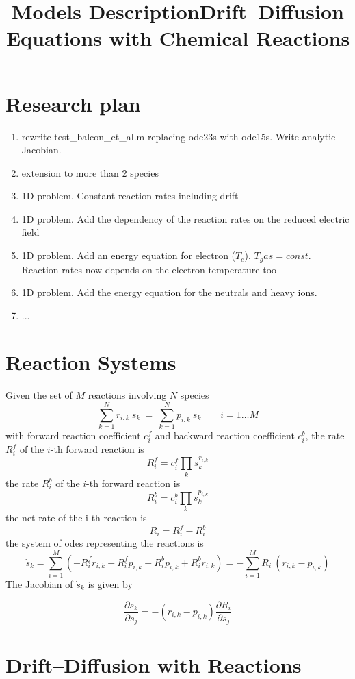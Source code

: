 \documentclass[11pt]{amsart}
\title{Models Description}
\title{Drift--Diffusion Equations with Chemical Reactions}
\begin{document}
\maketitle

\section{Research plan}
\begin{enumerate}
    \item rewrite test\_balcon\_et\_al.m replacing ode23s with ode15s. Write analytic Jacobian.
    \item extension to more than 2 species
    \item 1D problem. Constant reaction rates including drift
    \item 1D problem. Add the dependency of the reaction rates on the reduced electric field
    \item 1D problem. Add an energy equation for electron ($T_e$). $T_gas=const$. Reaction rates now depends on the electron temperature too
    \item 1D problem. Add the energy equation for the neutrals and heavy ions.
    \item ...
\end{enumerate}
\section{Reaction Systems}

Given the set of $M$ reactions involving $N$ species
\[
\sum_{k=1}^{N} r_{i,k}\ s_k\ =\ \sum_{k=1}^{N} p_{i,k}\ s_k \qquad  i=1\ldots M
\]
with forward reaction coefficient $c^f_i$ and backward reaction coefficient $c^b_i$,
the rate $R^{f}_i$ of the $i$-th forward reaction is 
$$
 R^{f}_i = c^{f}_i \prod_k s_k^{ r_{i,k} }
$$
the rate $R^{b}_i$ of the $i$-th forward reaction is 
$$
 R^{b}_i = c^{b}_i \prod_k s_k^{ p_{i,k} }
$$
the net rate of the i-th reaction is 
$$
R_i = R^{f}_i - R^{b}_i
$$
the system of odes representing the reactions is
$$
\dot{s}_k = \sum_{i=1}^M \left( - R^{f}_i r_{i,k} + R^{f}_i p_{i,k}
             - R^{b}_i p_{i,k} + R^{b}_i r_{i,k} \right) =
             - \sum_{i=1}^M  R_i\ (r_{i,k} - p_{i,k}) 
$$
The Jacobian of $\dot{s}_k$ is given by

$$
\dfrac{\partial \dot{s}_k}{\partial s_j} = -(r_{i,k} - p_{i,k}) \dfrac{\partial R_i}{\partial s_j}
$$

\section{Drift--Diffusion with Reactions}
\end{document}
